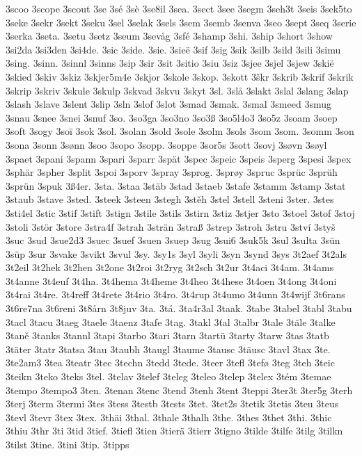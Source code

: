 3scoo
3scope
3scout
3se
3sé
3sè
3se8il
3sea.
3sect
3see
3segm
3seh3t
3seis
3sek5to
3seke
3sekr
3sekt
3seku
3sel
3selak
3sels
3sem
3semb
3senva
3seo
3sept
3seq
3serie
3serka
3seta.
3setu
3setz
3seum
3sevåg
3sfé
3shamp
3shi.
3ship
3short
3show
3si2da
3si3den
3si4de.
3sic
3side.
3sie.
3sieë
3sif
3sig
3sik
3silb
3sild
3sili
3simu
3sing.
3sinn.
3sinnl
3sinns
3sip
3sir
3sit
3sitio
3siu
3siz
3sjee
3sjel
3sjew
3skië
3skied
3skiv
3skiz
3skjer5m4e
3skjor
3skole
3skop.
3skott
3škr
3skrib
3skrif
3skrik
3skrip
3skriv
3skule
3skulp
3skvad
3skvu
3skyt
3sl.
3slå
3slakt
3slal
3slang
3slap
3slash
3slave
3slent
3slip
3sln
3slof
3slot
3smad
3smak.
3smal
3smeed
3smug
3snau
3snee
3snei
3snuf
3so.
3so3ga
3so3no
3so3ß
3so5l4o3
3so5z
3soam
3soep
3soft
3sogy
3soï
3sok
3sol.
3solan
3sold
3sole
3solm
3sols
3som
3som.
3somm
3son
3sona
3sonn
3sønn
3soo
3sopo
3sopp.
3soppe
3sor5s
3sott
3sovj
3søvn
3søyl
3spaet
3spani
3spann
3spari
3sparr
3spät
3spec
3speic
3speis
3sperg
3spesi
3spex
3sphär
3spher
3split
3spoi
3sporv
3spray
3sprog.
3sprøy
3spruc
3sprüc
3sprüh
3sprün
3spuk
3ß4er.
3sta.
3staa
3stäb
3stad
3staeb
3stafe
3stamm
3stamp
3stat
3staub
3stave
3sted.
3steek
3steen
3stegh
3stěh
3stel
3stell
3steni
3ster.
3stes
3sti4el
3stic
3stif
3stift
3stign
3stile
3stils
3stirn
3stiz
3stjer
3sto
3stoel
3stof
3stoj
3stoli
3stör
3store
3stra4f
3strah
3strän
3straß
3strep
3stroh
3stru
3ství
3styš
3suc
3sud
3sue2d3
3suec
3suef
3suen
3suep
3sug
3sui6
3suk5k
3sul
3sulta
3sün
3süp
3sur
3svake
3svikt
3svul
3sy.
3sy1s
3syl
3syli
3syn
3synd
3sys
3t2aef
3t2als
3t2eil
3t2hek
3t2hen
3t2one
3t2roi
3t2ryg
3t2sch
3t2ur
3t4aci
3t4am.
3t4ams
3t4anne
3t4euf
3t4ha.
3t4hema
3t4heme
3t4heo
3t4hese
3t4oen
3t4ong
3t4oni
3t4rai
3t4re.
3t4reff
3t4rete
3t4rio
3t4ro.
3t4rup
3t4umo
3t4unn
3t4wijf
3t6rans
3t6re7na
3t6reni
3t8årn
3t8juv
3ta.
3tá.
3ta4r3al
3taak.
3tabe
3tabel
3tabl
3tabu
3tacl
3tacu
3taeg
3taele
3taenz
3tafe
3tag.
3takl
3ťal
3talbr
3tale
3täle
3talke
3taně
3tanks
3tannl
3tapi
3tarbo
3tari
3tarn
3tartü
3tarty
3tarw
3tas
3tatb
3täter
3tatr
3tatsa
3tau
3taubh
3taugl
3taume
3tausc
3täusc
3tavl
3tax
3te.
3te2am3
3tea
3teatr
3tec
3techn
3tedd
3tede.
3teer
3tefl
3tefø
3teg
3teh
3teic
3teikn
3teko
3teks
3tel.
3telav
3telef
3teleg
3teleo
3telep
3telex
3tém
3temae
3tempo
3tempo3
3ten.
3tenan
3tenc
3tend
3tenh
3tent
3teppi
3ter3t
3ter5g
3terh
3terj
3term
3termi
3tes
3tess
3testb
3tests
3tet.
3tet2s
3tetik
3tetis
3teu
3teus
3tevl
3tevr
3tex
3tex.
3thäi
3thal.
3thale
3thalh
3the.
3thes
3thet
3thi.
3thic
3thiu
3thr
3ti
3tid
3tief.
3tiefl
3tien
3tierä
3tierr
3tigno
3tilde
3tilfe
3tilg
3tilkn
3tilst
3tine.
3tini
3tip.
3tipps
